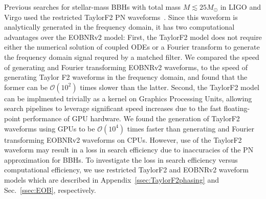 Previous searches for stellar-mass BBHs  with total mass $M \lesssim 25
M_\odot$ in LIGO and Virgo used the restricted TaylorF2 PN
waveforms~\cite{Sathyaprakash:1991mt,Cutler:1994ys,Droz:1999qx}. Since this
waveform is analytically generated in the frequency domain, it has two
computational advantages over the EOBNRv2 model: First, the TaylorF2 model does not require
either the numerical solution of coupled ODEs or a Fourier transform to
generate the frequency domain signal requred by a matched filter. 
We compared the speed of generating and Fourier
transforming EOBNRv2 waveforms, to the speed of generating Taylor F2
waveforms in the frequency domain, and found that the former can be
$\mathcal{O}(10^2)$ times slower than the latter. Second, the TaylorF2 model can be implmented trivially as a
kernel on Graphics Processing Units, allowing search pipelines to leverage
significant speed increases due to the fast floating-point performance of
GPU hardware. We found the generation of TaylorF2 waveforms using GPUs to be
$\mathcal{O}(10^4)$ times faster than generating and Fourier
transforming EOBNRv2 waveforms on CPUs. However, use of the TaylorF2 waveform 
may result in a loss in search efficiency due to inaccuracies of the PN 
approximation for BBHs. To investigate the loss in search efficiency versus 
computational efficiency, we use restricted TaylorF2 and EOBNRv2 waveform
models which are described in Appendix~\ref{ssec:TaylorF2phasing} and 
Sec.~\ref{ssec:EOB}, respectively.

